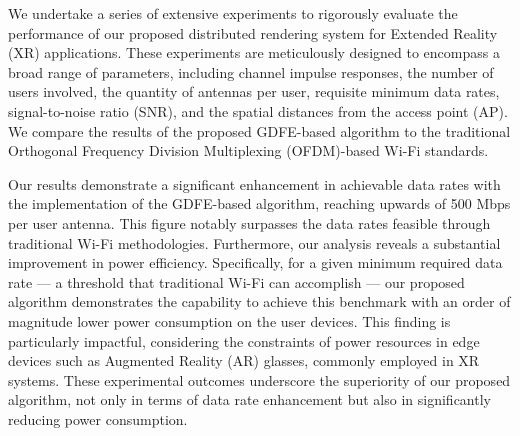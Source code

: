 We undertake a series of extensive experiments to rigorously evaluate the performance of our proposed distributed rendering system for Extended Reality (XR) applications. These experiments are meticulously designed to encompass a broad range of parameters, including channel impulse responses, the number of users involved, the quantity of antennas per user, requisite minimum data rates, signal-to-noise ratio (SNR), and the spatial distances from the access point (AP). We compare the results of the proposed GDFE-based algorithm to the traditional Orthogonal Frequency Division Multiplexing (OFDM)-based Wi-Fi standards.

Our results demonstrate a significant enhancement in achievable data rates with the implementation of the GDFE-based algorithm, reaching upwards of 500 Mbps per user antenna. This figure notably surpasses the data rates feasible through traditional Wi-Fi methodologies. Furthermore, our analysis reveals a substantial improvement in power efficiency. Specifically, for a given minimum required data rate — a threshold that traditional Wi-Fi can accomplish — our proposed algorithm demonstrates the capability to achieve this benchmark with an order of magnitude lower power consumption on the user devices. This finding is particularly impactful, considering the constraints of power resources in edge devices such as Augmented Reality (AR) glasses, commonly employed in XR systems. These experimental outcomes underscore the superiority of our proposed algorithm, not only in terms of data rate enhancement but also in significantly reducing power consumption. 